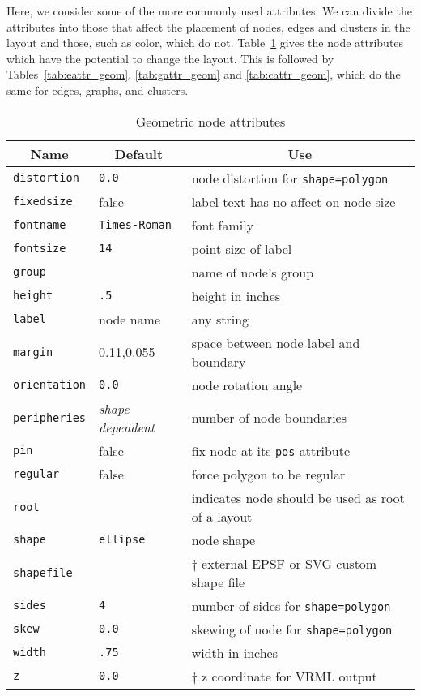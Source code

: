 Here, we consider some of the more commonly used attributes.
We can divide the attributes into those that affect the placement
of nodes, edges and clusters in the layout and those, such as color, 
which do not. 
Table~\ref{tab:nattr_geom} gives the node attributes which have the potential
to change the layout. This is followed by Tables~\ref{tab:eattr_geom},
\ref{tab:gattr_geom} and \ref{tab:cattr_geom}, which do the same for 
edges, graphs, and clusters.
\begin{table}[htbp]\footnotesize
\centering
\begin{tabular}[t]{|l|l|p{2.5in}|} \hline
\multicolumn{1}{|c|}{Name} & \multicolumn{1}{c|}{Default} & \multicolumn{1}{c|}{Use} \\ \hline
{\tt distortion} & {\tt 0.0} & node distortion for {\tt shape=polygon} \\
{\tt fixedsize} & false & label text has no affect on node size \\
{\tt fontname} & {\tt Times-Roman} & font family \\
{\tt fontsize} & {\tt 14} & point size of label \\
{\tt group} &  & name of node's group \\
{\tt height} & {\tt .5} & height in inches \\
{\tt label} & node name & any string \\
{\tt margin} &  0.11,0.055 & space between node label and boundary \\
{\tt orientation} & {\tt 0.0} & node rotation angle \\
{\tt peripheries} & {\em shape dependent} & number of node boundaries \\
{\tt pin} & false & fix node at its {\tt pos} attribute \\
{\tt regular} & false & force polygon to be regular \\
{\tt root} & & indicates node should be used as root of a layout \\
{\tt shape} & {\tt ellipse} & node shape \\
{\tt shapefile} & & $\dagger$ external EPSF or SVG custom shape file\\
{\tt sides} & {\tt 4} & number of sides for {\tt shape=polygon} \\
{\tt skew} & {\tt 0.0} & skewing of node for {\tt shape=polygon} \\
{\tt width} & {\tt .75} & width in inches \\
{\tt z} & {\tt 0.0} & $\dagger$ z coordinate for VRML output \\
\hline
\end{tabular}
\caption{Geometric node attributes}
\label{tab:nattr_geom}
\end{table}
